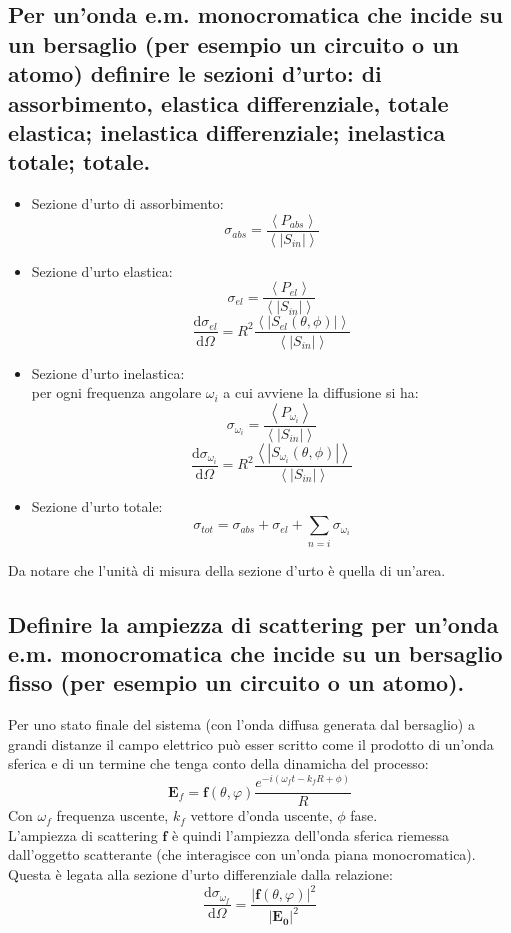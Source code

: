 \subsection[]{ Per un’onda e.m. monocromatica che incide su un bersaglio (per esempio un circuito o un atomo) definire le sezioni d’urto: di assorbimento, elastica differenziale, totale elastica; inelastica differenziale; inelastica totale; totale.}
\begin{itemize}
\item Sezione d'urto di assorbimento: 
	\[
		\sigma_{abs} = \frac{\left< P_{abs} \right> }{\left< \left|S_{in}\right| \right> }
	\] 	
\item Sezione d'urto elastica:
	\[
		\sigma_{el} = \frac{\left<P_{el} \right>}{\left< \left| S_{in} \right|  \right>} 
	\] 
	\[
		\frac{\mbox{d} \sigma_{el}}{\mbox{d} \Omega} = R^2 \frac{\left< \left| S_{el}\left( \theta,\phi \right)  \right|\right>}{ \left< \left| S_{in} \right|  \right> } 
	\] 
\item Sezione d'urto inelastica:\\
per ogni frequenza angolare $\omega_{i}$ a cui avviene la diffusione si ha:
\[
	\sigma_{\omega_{i}} = \frac{\left<P_{\omega_{i}} \right>}{\left< \left| S_{in} \right|  \right>} 
\] 
\[
	\frac{\mbox{d} \sigma_{\omega_{i}}}{\mbox{d} \Omega} = R^2 \frac{\left< \left| S_{\omega_{i}}\left( \theta,\phi \right)  \right|\right>}{ \left< \left| S_{in} \right|  \right> }
\] 
\item Sezione d'urto totale: 
	\[
	\sigma_{tot} = \sigma_{abs} + \sigma_{el} + \sum_{n=i} \sigma_{\omega_{i}}
	\] 
\end{itemize}
Da notare che l'unità di misura della sezione d'urto è quella di un'area.

\subsection[]{ Definire la ampiezza di scattering per un’onda e.m. monocromatica che incide su un bersaglio fisso (per esempio un circuito o un atomo).}
Per uno stato finale del sistema (con l'onda diffusa generata dal bersaglio) a grandi distanze il campo elettrico può esser scritto come il prodotto di un'onda sferica e di un termine che tenga conto della dinamicha del processo:
\[
	\boldsymbol{E}_{f} = \boldsymbol{f}\left( \theta, \varphi \right) \frac{e^{-i\left( \omega_{f}t - k_{f}R + \phi \right)}}{R}
\]
Con $\omega_{f}$ frequenza uscente, $k_{f}$ vettore d'onda uscente, $\phi$ fase.\\
L'ampiezza di scattering $\boldsymbol{f}$ è quindi l'ampiezza dell'onda sferica riemessa dall'oggetto scatterante (che interagisce con un'onda piana monocromatica). Questa è legata alla sezione d'urto differenziale dalla relazione:
\[
	\frac{\mbox{d} \sigma_{\omega_{f}}}{\mbox{d} \Omega} = \frac{\left| \boldsymbol{f}\left( \theta, \varphi \right) \right|^2}{\left| \boldsymbol{E_{0}} \right|^2 }
\] 


